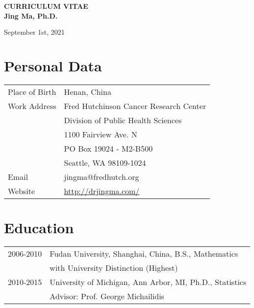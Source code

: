 \documentclass[10pt]{article}
\begin{document}
 

\begin{center}
{\large\bf 
CURRICULUM VITAE\\
Jing Ma, Ph.D.\\
}

September 1st, 2021 

\vspace{1em}

\end{center} 

\section{Personal Data}

\begin{table}[H]
\hskip0.4cm\begin{tabular}{p{2cm}p{12.5cm}}
Place of Birth & Henan, China                           \\
{Work Address}   & Fred Hutchinson Cancer Research Center \\
& Division of Public Health Sciences\\
& 1100 Fairview Ave. N\\
& PO Box 19024 - M2-B500 \\
& Seattle, WA 98109-1024 \\
Email          & jingma@fredhutch.org \\
Website        & \url{http://drjingma.com/}                          
\end{tabular}
\end{table}


\section{Education}

\begin{table}[H]
\hskip0.9cm\begin{tabular}{p{1.6cm}p{12.5cm}}
2006-2010 & Fudan University, Shanghai, China, B.S., Mathematics \\
& with University Distinction (Highest)\\
2010-2015 & University of Michigan, Ann Arbor, MI, Ph.D., Statistics \\
& {Advisor}: Prof. George Michailidis
\end{tabular}
\end{table}
\end{document}
